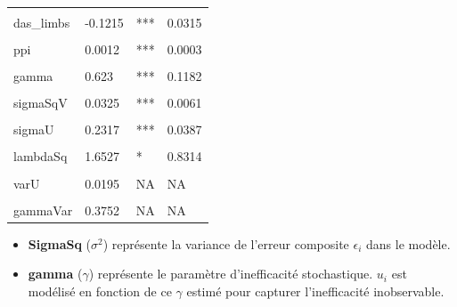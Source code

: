 \documentclass[
  12pt,
]{report}
\begin{document}
\begin{table}[!h]
\begin{tabular}[t]{llll}
\cellcolor{gray!10}{upgrade\_storageTRUE} & \cellcolor{gray!10}{-0.2619} & \cellcolor{gray!10}{***} & \cellcolor{gray!10}{0.0455}\\
das\_limbs & -0.1215 & *** & 0.0315\\
\addlinespace
\cellcolor{gray!10}{network5G} & \cellcolor{gray!10}{0.2022} & \cellcolor{gray!10}{***} & \cellcolor{gray!10}{0.0382}\\
ppi & 0.0012 & *** & 0.0003\\
\cellcolor{gray!10}{sigmaSq} & \cellcolor{gray!10}{0.0861} & \cellcolor{gray!10}{***} & \cellcolor{gray!10}{0.0132}\\
gamma & 0.623 & *** & 0.1182\\
\cellcolor{gray!10}{sigmaSqU} & \cellcolor{gray!10}{0.0537} & \cellcolor{gray!10}{**} & \cellcolor{gray!10}{0.0179}\\
\addlinespace
sigmaSqV & 0.0325 & *** & 0.0061\\
\cellcolor{gray!10}{sigma} & \cellcolor{gray!10}{0.2935} & \cellcolor{gray!10}{***} & \cellcolor{gray!10}{0.0225}\\
sigmaU & 0.2317 & *** & 0.0387\\
\cellcolor{gray!10}{sigmaV} & \cellcolor{gray!10}{0.1802} & \cellcolor{gray!10}{***} & \cellcolor{gray!10}{0.0171}\\
lambdaSq & 1.6527 & * & 0.8314\\
\addlinespace
\cellcolor{gray!10}{lambda} & \cellcolor{gray!10}{1.2856} & \cellcolor{gray!10}{***} & \cellcolor{gray!10}{0.3234}\\
varU & 0.0195 & NA & NA\\
\cellcolor{gray!10}{sdU} & \cellcolor{gray!10}{0.1397} & \cellcolor{gray!10}{NA} & \cellcolor{gray!10}{NA}\\
gammaVar & 0.3752 & NA & NA\\
\bottomrule
\end{tabular}
\end{table}

\begin{itemize}
\item
  \textbf{SigmaSq} (\(\sigma^2\)) représente la variance de l'erreur
  composite \(\epsilon_i\) dans le modèle.
\item
  \textbf{gamma} (\(\gamma\)) représente le paramètre d'inefficacité
  stochastique. \(u_i\)\hspace{0pt} est modélisé en fonction de ce
  \(\gamma\) estimé pour capturer l'inefficacité inobservable.
\end{itemize}
\end{document}
